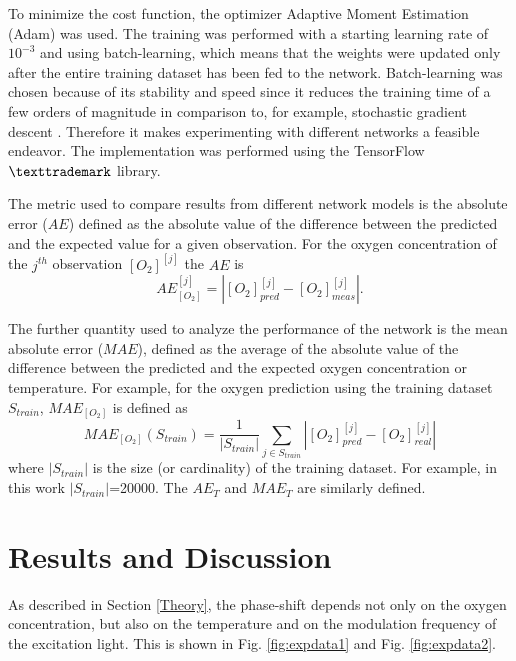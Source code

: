 \documentclass[9pt,twocolumn,twoside,pdftex]{optica}
\begin{document}
To minimize the cost function, the optimizer Adaptive Moment Estimation (Adam) \cite{Kingma2014, Michelucci2017} was used. The training was performed with a starting learning rate of $10^{-3}$ and using batch-learning, which means that the weights were updated only after the entire training dataset has been fed to the network. Batch-learning was chosen because of its stability and speed since it reduces the training time of a few orders of magnitude in comparison to, for example, stochastic gradient descent \cite{Michelucci2017}. Therefore it makes experimenting with different networks a feasible endeavor. 
The implementation was performed using the TensorFlow$\texttrademark$ library. 

The metric used to compare results from different network models is the absolute error ($AE$) defined as the absolute value of the difference between the predicted and the expected value for a given observation. For the oxygen concentration of the 
$j^{th}$ observation $[O_2]^{[j]}$  the $AE$ is 
\begin{equation}
\label{AE}
AE^{[j]}_{[O_2]} = |[O_2]^{[j]}_{pred}-[O_2]^{[j]}_{meas}|.
\end{equation}

The further quantity used to analyze the performance of the network is the mean absolute error ($MAE$), defined as the average of the absolute value of the difference between the predicted and the expected oxygen concentration or temperature. For example, for the oxygen prediction using the training dataset $S_{train}$, $MAE_{[O_2]}$ is defined as 
\begin{equation}
\label{MAE}
MAE_{[O_2]}(S_{train}) = \frac{1}{|S_{train}|} \sum_{j \in S_{train}}|[O_2]_{pred}^{[j]}-[O_2]_{real}^{[j]}|
\end{equation}
where $|S_{train}|$ is the size (or cardinality) of the training dataset. For example, in this work $|S_{train}|$=20000.
The $AE_{T}$ and $MAE_T$ are similarly defined.


\section{Results and Discussion}
\label{Results}

As described in Section \ref{Theory}, the phase-shift depends not only on the oxygen concentration, but also on the temperature and on the modulation frequency of the excitation light. This is shown in Fig. \ref{fig:expdata1} and Fig. \ref{fig:expdata2}.
\end{document}
